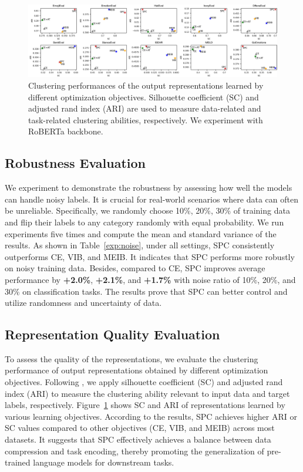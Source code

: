 \documentclass[letterpaper]{article} %
\begin{document}
\begin{figure}[t]
\centering
\includegraphics[width=0.95\linewidth]{figures/struc_eval.png}  
\caption{Clustering performances of the output representations learned by different optimization objectives. Silhouette coefficient (SC) and adjusted rand index (ARI) are used to measure data-related and task-related clustering abilities, respectively.
We experiment with RoBERTa backbone.}
\label{fig:struct}
\end{figure}

\subsection{Robustness Evaluation}
We experiment to demonstrate the robustness by assessing how well the models can handle noisy labels. 
It is crucial for real-world scenarios where data can often be unreliable.
Specifically, we randomly choose 10\%, 20\%, 30\% of training data and flip their labels to any category randomly with equal probability. 
We run experiments five times and compute the mean and standard variance of the results. As shown in Table~\ref{exp:noise}, 
under all settings, SPC consistently outperforms CE, VIB, and MEIB. 
It indicates that SPC performs more robustly on noisy training data. 
Besides, compared to CE, SPC improves average performance by \textbf{+2.0\%}, \textbf{+2.1\%}, and \textbf{+1.7\%}  with noise ratio of 10\%, 20\%, and 30\% on classification tasks. 
The results prove that SPC can better control and utilize randomness and uncertainty of data.



\subsection{Representation Quality Evaluation}
To assess the quality of the representations, we evaluate the clustering performance of output representations obtained by different optimization objectives.
Following \citet{DBLP:conf/acl/0001BWZH23}, we apply silhouette coefficient (SC) and adjusted rand index (ARI) to measure the clustering ability relevant to input data and target labels, respectively.
Figure~\ref{fig:struct} shows SC and ARI of representations learned by various learning objectives. 
According to the results, SPC achieves higher ARI or SC values compared to other objectives (CE, VIB, and MEIB) across most datasets.
It suggests that SPC effectively achieves a balance between data compression and task encoding, thereby promoting the generalization of pre-trained language models for downstream tasks.
\end{document}
